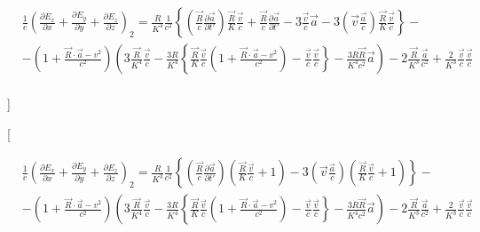 \documentclass[11pt]{article}
\begin{document}
\begin{align}
  & \frac{1}{e}{{\left( \frac{\partial {{E}_{x}}}{\partial x}+\frac{\partial {{E}_{y}}}{\partial y}+\frac{\partial {{E}_{z}}}{\partial z} \right)}_{2}}=\frac{R}{{{K}^{3}}}\frac{1}{{{c}^{2}}}\left\{ \left( \frac{\overrightarrow{R}}{c}\frac{\partial \overrightarrow{a}}{\partial t'} \right)\frac{\overrightarrow{R}}{K}\frac{\overrightarrow{v}}{c}+\frac{\overrightarrow{R}}{c}\frac{\partial \overrightarrow{a}}{\partial t'}-3\frac{\overrightarrow{v}}{c}\overrightarrow{a}-3\left( \overrightarrow{v}\frac{\overrightarrow{a}}{c} \right)\frac{\overrightarrow{R}}{K}\frac{\overrightarrow{v}}{c} \right\}- \\ 
 & -\left( 1+\frac{\overrightarrow{R}\cdot \overrightarrow{a}-{{v}^{2}}}{{{c}^{2}}} \right)\left( 3\frac{\overrightarrow{R}}{{{K}^{4}}}\frac{\overrightarrow{v}}{c}-\frac{3R}{{{K}^{4}}}\left\{ \frac{\overrightarrow{R}}{K}\frac{\overrightarrow{v}}{c}\left( 1+\frac{\overrightarrow{R}\cdot \overrightarrow{a}-{{v}^{2}}}{{{c}^{2}}} \right)-\frac{\overrightarrow{v}}{c}\frac{\overrightarrow{v}}{c} \right\}-\frac{3R\overrightarrow{R}}{{{K}^{4}}{{c}^{2}}}\overrightarrow{a} \right)-2\frac{\overrightarrow{R}}{{{K}^{3}}}\frac{\overrightarrow{a}}{{{c}^{2}}}+\frac{2}{{{K}^{3}}}\frac{\overrightarrow{v}}{c}\frac{\overrightarrow{v}}{c} \\ 
\end{align}

{]}

{[}

\begin{align}
  & \frac{1}{e}{{\left( \frac{\partial {{E}_{x}}}{\partial x}+\frac{\partial {{E}_{y}}}{\partial y}+\frac{\partial {{E}_{z}}}{\partial z} \right)}_{2}}=\frac{R}{{{K}^{3}}}\frac{1}{{{c}^{2}}}\left\{ \left( \frac{\overrightarrow{R}}{c}\frac{\partial \overrightarrow{a}}{\partial t'} \right)\left( \frac{\overrightarrow{R}}{K}\frac{\overrightarrow{v}}{c}+1 \right)-3\left( \overrightarrow{v}\frac{\overrightarrow{a}}{c} \right)\left( \frac{\overrightarrow{R}}{K}\frac{\overrightarrow{v}}{c}+1 \right) \right\}- \\ 
 & -\left( 1+\frac{\overrightarrow{R}\cdot \overrightarrow{a}-{{v}^{2}}}{{{c}^{2}}} \right)\left( 3\frac{\overrightarrow{R}}{{{K}^{4}}}\frac{\overrightarrow{v}}{c}-\frac{3R}{{{K}^{4}}}\left\{ \frac{\overrightarrow{R}}{K}\frac{\overrightarrow{v}}{c}\left( 1+\frac{\overrightarrow{R}\cdot \overrightarrow{a}-{{v}^{2}}}{{{c}^{2}}} \right)-\frac{\overrightarrow{v}}{c}\frac{\overrightarrow{v}}{c} \right\}-\frac{3R\overrightarrow{R}}{{{K}^{4}}{{c}^{2}}}\overrightarrow{a} \right)-2\frac{\overrightarrow{R}}{{{K}^{3}}}\frac{\overrightarrow{a}}{{{c}^{2}}}+\frac{2}{{{K}^{3}}}\frac{\overrightarrow{v}}{c}\frac{\overrightarrow{v}}{c} \\ 
\end{align}
\end{document}
